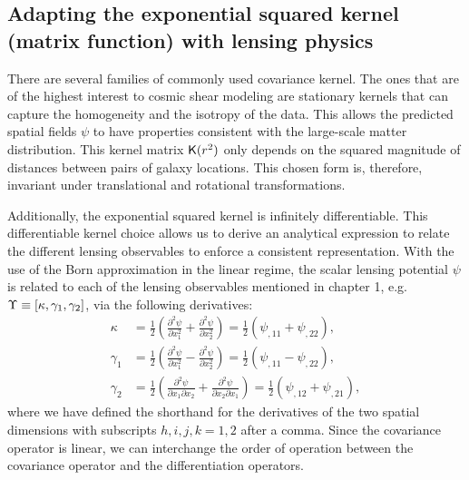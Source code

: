 \subsection{Adapting the exponential squared kernel (matrix function) with lensing physics}
There are several families of commonly used covariance kernel.
The ones that are of the highest interest to cosmic shear modeling 
are stationary kernels that can capture 
the homogeneity and the isotropy of the data. This allows the predicted spatial fields
$\psi$ to have properties consistent with the large-scale matter distribution.
%
This kernel matrix $\mathsf{K}(r^2)$ only depends on the
squared magnitude of distances between pairs of galaxy locations. 
This chosen form is, therefore, invariant
under translational and rotational transformations.

Additionally, the exponential squared kernel is infinitely differentiable. This
differentiable kernel choice allows us to derive an analytical expression to
relate the different lensing observables to enforce a consistent representation.  
With the use of the Born approximation in the linear regime, the scalar lensing potential $\psi$ is related to 
each of the lensing observables mentioned in chapter 1, e.g. 
$\Upsilon \equiv [\kappa, \gamma_1, \gamma_2]$, via the following derivatives:
\begin{align}
\kappa &= \frac{1}{2}\left(\frac{\partial^2 \psi}{\partial x_1^2} +
\frac{\partial^2 \psi}{\partial x_2^2 }\right) 
= \frac{1}{2} (\psi_{,11} + \psi_{,22}),\\ 
\gamma_1 
&=\frac{1}{2}\left(\frac{\partial^2 \psi}{\partial x_1^2} - 
\frac{\partial^2 \psi}{\partial x_2^2}\right) 
= \frac{1}{2} (\psi_{,11} - \psi_{,22}), \\
\gamma_2 
&=\frac{1}{2}\left(\frac{\partial^2 \psi}{\partial x_1 \partial
x_2} + \frac{\partial^2 \psi}{\partial x_2 \partial x_1}\right)
= \frac{1}{2} (\psi_{,12} + \psi_{,21}), 
\end{align}
where we have defined the shorthand for the derivatives of the two spatial dimensions with
subscripts $h,i,j,k = 1, 2$ after a comma.
Since the covariance operator is linear, we can interchange the order of
operation between the covariance operator and the differentiation operators. 

